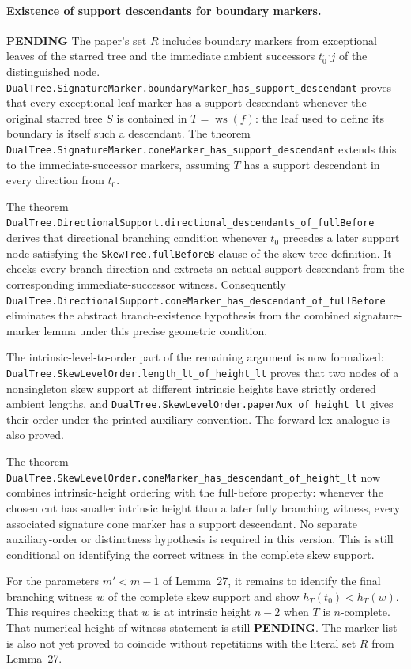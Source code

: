 \documentclass[11pt]{article}
\newcommand{\todo}{\textcolor{gray!70!black}{\textbf{PENDING}}}
\newcommand{\lean}[1]{\texttt{#1}}
\begin{document}
\paragraph{Existence of support descendants for boundary markers.} \todo
The paper's set $R$ includes boundary markers from exceptional leaves
of the starred tree and the immediate ambient successors $t_0^\frown j$
of the distinguished node.
\lean{DualTree.SignatureMarker.boundaryMarker_has_support_descendant}
proves that every exceptional-leaf marker has a support descendant whenever
the original starred tree $S$ is contained in $T=\operatorname{ws}(f)$:
the leaf used to define its boundary is itself such a descendant.
The theorem
\lean{DualTree.SignatureMarker.coneMarker_has_support_descendant}
extends this to the immediate-successor markers, assuming $T$ has a
support descendant in every direction from $t_0$.

The theorem
\lean{DualTree.DirectionalSupport.directional_descendants_of_fullBefore}
derives that directional branching condition whenever $t_0$ precedes
a later support node satisfying the \lean{SkewTree.fullBeforeB}
clause of the skew-tree definition.  It checks every branch
direction and extracts an actual support descendant from the
corresponding immediate-successor witness.
Consequently
\lean{DualTree.DirectionalSupport.coneMarker_has_descendant_of_fullBefore}
eliminates the abstract branch-existence hypothesis from the combined
signature-marker lemma under this precise geometric condition.

The intrinsic-level-to-order part of the remaining argument is now
formalized:
\lean{DualTree.SkewLevelOrder.length_lt_of_height_lt}
proves that two nodes of a nonsingleton skew support at different
intrinsic heights have strictly ordered ambient lengths, and
\lean{DualTree.SkewLevelOrder.paperAux_of_height_lt}
gives their order under the printed auxiliary convention.  The
forward-lex analogue is also proved.

The theorem
\lean{DualTree.SkewLevelOrder.coneMarker_has_descendant_of_height_lt}
now combines intrinsic-height ordering with the full-before property:
whenever the chosen cut has smaller intrinsic height than a later
fully branching witness, every associated signature cone marker has a
support descendant.  No separate auxiliary-order or distinctness
hypothesis is required in this version.  This is still conditional
on identifying the correct witness in the complete skew support.

For the parameters $m'<m-1$ of Lemma~27, it remains to identify the
final branching witness $w$ of the complete skew support and show
$h_T(t_0)<h_T(w)$.  This requires checking that $w$ is at
intrinsic height $n-2$ when $T$ is $n$-complete.  That numerical
height-of-witness statement is still \todo.
The marker list is also not yet proved to coincide without
repetitions with the literal set $R$ from Lemma~27.
\end{document}
